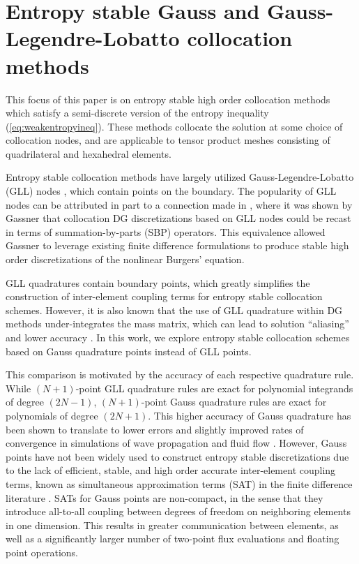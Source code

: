 \documentclass[review,onefignum,onetabnum,final]{siamart171218}
\begin{document}
\section{Entropy stable Gauss and Gauss-Legendre-Lobatto collocation methods}
\label{sec:1}

This focus of this paper is on entropy stable high order collocation methods which satisfy a semi-discrete version of the entropy inequality (\ref{eq:weakentropyineq}).  These methods collocate the solution at some choice of collocation nodes, and are applicable to tensor product meshes consisting of quadrilateral and hexahedral elements.  

Entropy stable collocation methods have largely utilized Gauss-Legendre-Lobatto (GLL) nodes \cite{fisher2013high, carpenter2014entropy, gassner2016split, gassner2017br1}, which contain points on the boundary.  The popularity of GLL nodes can be attributed in part to a connection made in \cite{gassner2013skew}, where it was shown by Gassner that collocation DG discretizations based on GLL nodes could be recast in terms of summation-by-parts (SBP) operators.  This equivalence allowed Gassner to leverage existing finite difference formulations to produce stable high order discretizations of the nonlinear Burgers' equation.  

GLL quadratures contain boundary points, which greatly simplifies the construction of inter-element coupling terms for entropy stable collocation schemes.  However, it is also known that the use of GLL quadrature within DG methods under-integrates the mass matrix, which can lead to solution ``aliasing'' and lower accuracy \cite{parsani2016entropy}.  In this work, we explore entropy stable collocation schemes based on Gauss quadrature points instead of GLL points.  

This comparison is motivated by the accuracy of each respective quadrature rule.  While $(N+1)$-point GLL quadrature rules are exact for polynomial integrands of degree $(2N-1)$, $(N+1)$-point Gauss quadrature rules are exact for polynomials of degree $(2N+1)$.  This higher accuracy of Gauss quadrature has been shown to translate to lower errors and slightly improved rates of convergence in simulations of wave propagation and fluid flow \cite{kopriva2010quadrature, hindenlang2012explicit, chan2015gpu}.  However, Gauss points have not been widely used to construct entropy stable discretizations due to the lack of efficient, stable, and high order accurate inter-element coupling terms, known as simultaneous approximation terms (SAT) in the finite difference literature \cite{fernandez2014review, crean2017high, fernandez2018simultaneous}.  SATs for Gauss points are non-compact, in the sense that they introduce all-to-all coupling between degrees of freedom on neighboring elements in one dimension.  This results in greater communication between elements, as well as a significantly larger number of two-point flux evaluations and floating point operations.  
\end{document}

